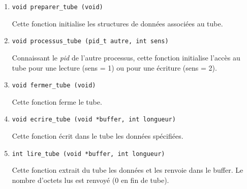 \begin {enumerate}
    \item \verb:void preparer_tube (void):

	Cette fonction initialise les structures de données associées
	au tube.

    \item \verb:void processus_tube (pid_t autre, int sens):

	Connaissant le \textit {pid} de l'autre processus, cette
	fonction initialise l'accès au tube pour une lecture (sens
	= 1) ou pour une écriture (sens = 2).

    \item \verb:void fermer_tube (void):

	Cette fonction ferme le tube.

    \item \verb:void ecrire_tube (void *buffer, int longueur):

	Cette fonction écrit dans le tube les données spécifiées.

    \item \verb:int lire_tube (void *buffer, int longueur):

	Cette fonction extrait du tube les données et les renvoie
	dans le buffer. Le nombre d'octets lus est renvoyé (0 en
	fin de tube).

\end {enumerate}


